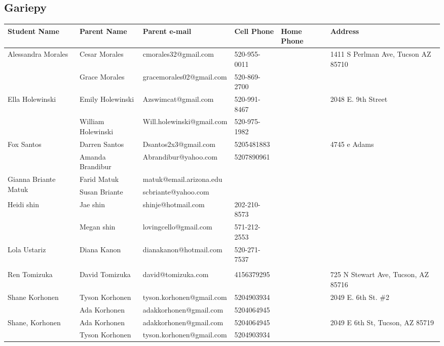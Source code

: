 \documentclass[landscape]{article}\usepackage[]{graphicx}\usepackage[]{color}
\begin{document}
\subsection{Gariepy}
\begin{longtable}{|p{100pt}|p{100pt}|p{140pt}|p{60pt}|p{64pt}|p{120pt}|}
\textbf{Student Name} & \textbf{Parent Name} & \textbf{Parent e-mail} & \textbf{Cell Phone} & \textbf{Home Phone} & \textbf{Address}\\
\hline
\hline
\multirow{2}{100pt}{Alessandra Morales } & Cesar Morales  & cmorales32@gmail.com & 520-955-0011 &  & \multirow{2}{120pt}{1411 S Perlman Ave, Tucson AZ 85710} \\
 & Grace Morales & gracemorales02@gmail.com & 520-869-2700 &  & \\
\hline
\multirow{2}{100pt}{Ella Holewinski} & Emily Holewinski & Azswimcat@gmail.com & 520-991-8467 &  & \multirow{2}{120pt}{2048 E. 9th Street} \\
 & William Holewinski & Will.holewinski@gmail.com & 520-975-1982 &  & \\
\hline
\multirow{2}{100pt}{Fox Santos} & Darren Santos & Dsantos2x3@gmail.com & 5205481883 &  & \multirow{2}{120pt}{4745 e Adams} \\
 & Amanda Brandibur & Abrandibur@yahoo.com & 5207890961 &  & \\
\hline
\multirow{2}{100pt}{Gianna Briante Matuk} & Farid Matuk & matuk@email.arizona.edu &  &  & \multirow{2}{120pt}{} \\
 & Susan Briante & scbriante@yahoo.com &  &  & \\
\hline
\multirow{2}{100pt}{Heidi shin} & Jae shin & shinje@hotmail.com & 202-210-8573 &  & \multirow{2}{120pt}{} \\
 & Megan shin & lovingcello@gmail.com & 571-212-2553 &  & \\
\hline
\multirow{2}{100pt}{Lola Ustariz} & Diana Kanon & dianakanon@hotmail.com & 520-271-7537 &  & \multirow{2}{120pt}{} \\
 &  &  &  &  & \\
\hline
\multirow{2}{100pt}{Ren Tomizuka} & David Tomizuka & david@tomizuka.com & 4156379295 &  & \multirow{2}{120pt}{725 N Stewart Ave, Tucson, AZ 85716} \\
 &  &  &  &  & \\
\hline
\multirow{2}{100pt}{Shane Korhonen} & Tyson Korhonen & tyson.korhonen@gmail.com & 5204903934 &  & \multirow{2}{120pt}{2049 E. 6th St. \#2} \\
 & Ada Korhonen & adakkorhonen@gmail.com & 5204064945 &  & \\
\hline
\multirow{2}{100pt}{Shane, Korhonen} & Ada Korhonen & adakkorhonen@gmail.com & 5204064945 &  & \multirow{2}{120pt}{2049 E 6th St, Tucson, AZ 85719} \\
 & Tyson Korhonen & tyson.korhonen@gmail.com & 5204903934 &  & \\
\hline
\end{longtable}
\newpage
\end{document}
